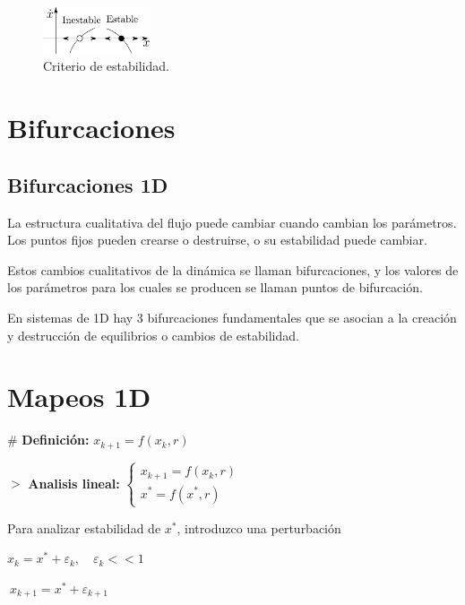 \documentclass[%
 reprint,
 amsmath,amssymb,
 aps,
]{revtex4-1}
\begin{document}
\begin{figure}[ht!]
  \includegraphics[width = 0.28\textwidth]{estable-Inestable.pdf}
  \caption{\label{fig:figura1} Criterio de estabilidad.}
\end{figure}

\section{Bifurcaciones}

\subsection{Bifurcaciones 1D}

La estructura cualitativa del flujo puede cambiar cuando cambian los parámetros. Los puntos fijos pueden crearse o destruirse, o su estabilidad puede cambiar.

Estos cambios cualitativos de la dinámica se llaman bifurcaciones, y los valores de los parámetros para los cuales se producen se llaman puntos de bifurcación. 

En sistemas de 1D hay 3 bifurcaciones fundamentales que se asocian a la creación y destrucción de equilibrios o cambios de estabilidad.






\section{Mapeos 1D}

\# \textbf{Definición: } $
x_{k+1} = f(x_k , r)
$

$>$ \textbf{Analisis lineal:}
$
\left\lbrace 
\begin{array}{l}
x_{k+1} = f(x_k , r) \\
x^{*} = f(x^{*}, r)
\end{array}
\right.
$

Para analizar estabilidad de $x^{*}$, introduzco una perturbación

$x_k = x^{*}+\varepsilon_k, \quad \varepsilon_k <<1 $

$\ x_{k+1} = {x}^{*} + \varepsilon_{k+1}$
\end{document}
